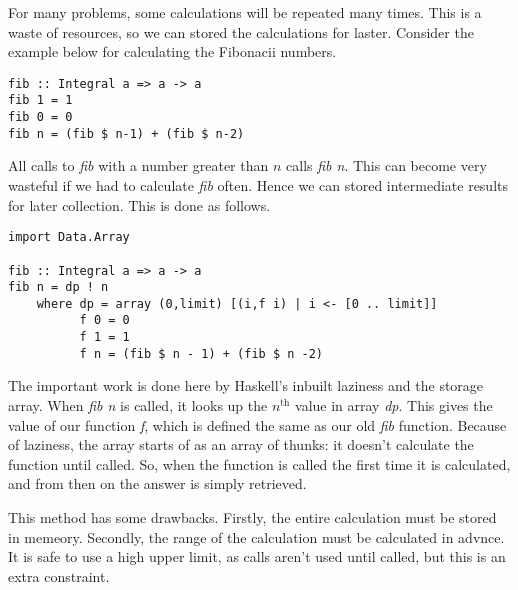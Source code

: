 For many problems, some calculations will be repeated many times. This is a waste of resources, so we can stored the calculations for laster. Consider the example below for calculating the Fibonacii numbers.

\begin{lstlisting}
fib :: Integral a => a -> a
fib 1 = 1
fib 0 = 0
fib n = (fib $ n-1) + (fib $ n-2)
\end{lstlisting}

All calls to \textit{fib} with a number greater than $n$ calls \textit{fib n}. This can become very wasteful if we had to calculate \textit{fib} often. Hence we can stored intermediate results for later collection. This is done as follows.

\begin{lstlisting}
import Data.Array

fib :: Integral a => a -> a
fib n = dp ! n
	where dp = array (0,limit) [(i,f i) | i <- [0 .. limit]]
	      f 0 = 0
	      f 1 = 1
	      f n = (fib $ n - 1) + (fib $ n -2)
\end{lstlisting}

The important work is done here by Haskell's inbuilt laziness and the storage array. When \textit{fib n} is called, it looks up the $n^\text{th}$ value in array \textit{dp}. This gives the value of our function \textit{f}, which is defined the same as our old \textit{fib} function. Because of laziness, the array starts of as an array of thunks: it doesn't calculate the function until called. So, when the function is called the first time it is calculated, and from then on the answer is simply retrieved.

This method has some drawbacks. Firstly, the entire calculation must be stored in memeory. Secondly, the range of the calculation must be calculated in advnce. It is safe to use a high upper limit, as calls aren't used until called, but this is an extra constraint.
